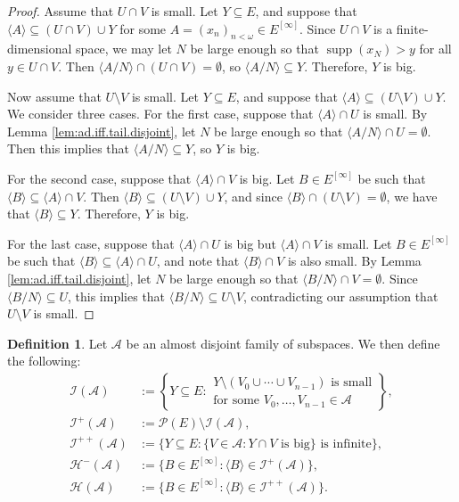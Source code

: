 \documentclass[10pt,a4paper]{amsart}
\theoremstyle{plain}
\numberwithin{equation}{section}
\theoremstyle{definition}
\newtheorem{definition}[theorem]{Definition}
\newcommand{\func}{\operatorname}
\renewcommand{\c}[1]{\langle #1 \rangle}
\renewcommand{\ss}[1]{\left\{ #1 \right\}}
\newcommand{\Po}{\cal{P}}
\newcommand{\cal}{\mathcal}
\newcommand{\supp}{\func{supp}}
\newcommand{\m}[1]{\begin{matrix} #1 \end{matrix}}
\newcommand{\A}{\cal{A}}
\renewcommand{\H}{\cal{H}}
\newcommand{\I}{\cal{I}}
\begin{document}
\begin{proof}
    Assume that $U \cap V$ is small. Let $Y \subseteq E$, and suppose that $\c{A} \subseteq (U \cap V) \cup Y$ for some $A = (x_n)_{n<\omega} \in E^{[\infty]}$. Since $U \cap V$ is a finite-dimensional space, we may let $N$ be large enough so that $\supp(x_N) > y$ for all $y \in U \cap V$. Then $\c{A/N} \cap (U \cap V) = \emptyset$, so $\c{A/N} \subseteq Y$. Therefore, $Y$ is big.

    Now assume that $U \setminus V$ is small. Let $Y \subseteq E$, and suppose that $\c{A} \subseteq (U \setminus V) \cup Y$. We consider three cases. For the first case, suppose that $\c{A} \cap U$ is small. By Lemma \ref{lem:ad.iff.tail.disjoint}, let $N$ be large enough so that $\c{A/N} \cap U = \emptyset$. Then this implies that $\c{A/N} \subseteq Y$, so $Y$ is big.

    For the second case, suppose that $\c{A} \cap V$ is big. Let $B \in E^{[\infty]}$ be such that $\c{B} \subseteq \c{A} \cap V$. Then $\c{B} \subseteq (U \setminus V) \cup Y$, and since $\c{B} \cap (U \setminus V) = \emptyset$, we have that $\c{B} \subseteq Y$. Therefore, $Y$ is big.

    For the last case, suppose that $\c{A} \cap U$ is big but $\c{A} \cap V$ is small. Let $B \in E^{[\infty]}$ be such that $\c{B} \subseteq \c{A} \cap U$, and note that $\c{B} \cap V$ is also small. By Lemma \ref{lem:ad.iff.tail.disjoint}, let $N$ be large enough so that $\c{B/N} \cap V = \emptyset$. Since $\c{B/N} \subseteq U$, this implies that $\c{B/N} \subseteq U \setminus V$, contradicting our assumption that $U \setminus V$ is small.
\end{proof}

\begin{definition}
\label{def:ad.semi-ideals.and.semicoideals}
    Let $\A$ be an almost disjoint family of subspaces. We then define the following:
    \begin{align*}
        \I(\A) &:= \ss{Y \subseteq E : \m{Y \setminus (V_0 \cup \cdots \cup V_{n-1}) \text{ is small} \\ \text{for some } V_0,\dots,V_{n-1} \in \A}}, \\
        \I^+(\A) &:= \Po(E) \setminus \I(\A), \\
        \I^{++}(\A) &:= \{Y \subseteq E : \{V \in \A : Y \cap V \text{ is big}\} \text{ is infinite}\}, \\
        \H^-(\A) &:= \{B \in E^{[\infty]} : \c{B} \in \I^+(\A)\}, \\
        \H(\A) &:= \{B \in E^{[\infty]} : \c{B} \in \I^{++}(\A)\}.
    \end{align*}
\end{definition}
\end{document}
